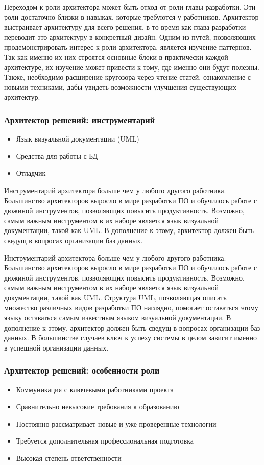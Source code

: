 \documentclass{../industrial-development}
\begin{document}
\lecturenotes
Переходом к роли архитектора может быть отход от роли главы разработки. Эти роли достаточно близки в навыках, которые требуются у работников. Архитектор выстраивает архитектуру для всего решения, в то время как глава разработки переводит это архитектуру в конкретный дизайн. 
Одним из путей, позволяющих продемонстрировать интерес к роли архитектора, является изучение паттернов. Так как именно их них строятся основные блоки в практически каждой архитектуре, их изучение может привести к тому, где именно они будут полезны. Также, необходимо расширение кругозора через чтение статей, ознакомление с новыми техниками, дабы увидеть возможности улучшения существующих архитектур. 
 ~\cite{Anatomy}

\begin{frame} \frametitle{Архитектор решений: инструментарий}
  \begin{itemize}
  \item Язык визуальной документации (UML)
  \item Средства для работы с БД
  \item Отладчик
  \end{itemize}
	\begin{block}{}
	\alert {} Инструментарий архитектора больше чем у любого другого работника. Большинство архитекторов выросло в мире разработки ПО и обучилось работе с дюжиной инструментов, позволяющих повысить продуктивность. 
	Возможно, самым важным инструментом в их наборе является язык визуальной документации, такой как UML. В дополнение к этому, архитектор должен быть сведущ в вопросах организации баз данных.
\end{block}
\end{frame}

\lecturenotes

Инструментарий архитектора больше чем у любого другого работника. Большинство архитекторов выросло в мире разработки ПО и обучилось работе с дюжиной инструментов, позволяющих повысить продуктивность. 
Возможно, самым важным инструментом в их наборе является язык визуальной документации, такой как UML. Структура UML, позволяющая описать множество различных видов разработки ПО наглядно, помогает оставаться этому языку оставаться самым известным языком визуальной документации. 
В дополнение к этому, архитектор должен быть сведущ в вопросах организации баз данных. В большинстве случаев ключ к успеху системы в целом зависит именно в успешной организации данных. 
  ~\cite{Anatomy}

\begin{frame} \frametitle{Архитектор решений: особенности роли}
  \begin{itemize}
  \item Коммуникация с ключевыми работниками проекта
  \item Сравнительно невысокие требования к образованию 
  \item Постоянно рассматривает новые и уже проверенные технологии
  \item Требуется дополнительная профессиональная подготовка
  \item Высокая степень ответственности 
  \end{itemize}
\end{frame}
\end{document}
